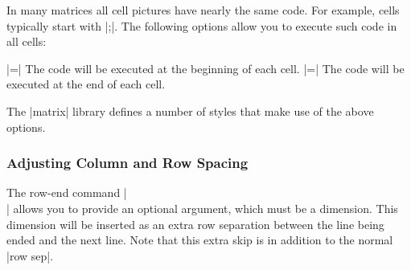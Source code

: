 In many matrices all cell pictures have nearly the same code. For
example, cells typically start with |;|. The
following options allow you to execute such code in all cells:

\begin{itemize}
  |=|
  The code will be executed at the beginning of each cell.
  |=|
  The code will be executed at the end of each cell.

\begin{codeexample}[]
\end{codeexample}
\end{itemize}

The |matrix| library defines a number of styles that make use of the
above options.


\subsubsection{Adjusting Column and Row Spacing}

The row-end command |\\| allows you to provide an optional
argument, which must be a dimension. This dimension will be inserted
as an extra row separation between the line being ended and the next
line. Note that this extra skip is in addition to the normal
|row sep|. 
\begin{codeexample}[]
\end{codeexample}


